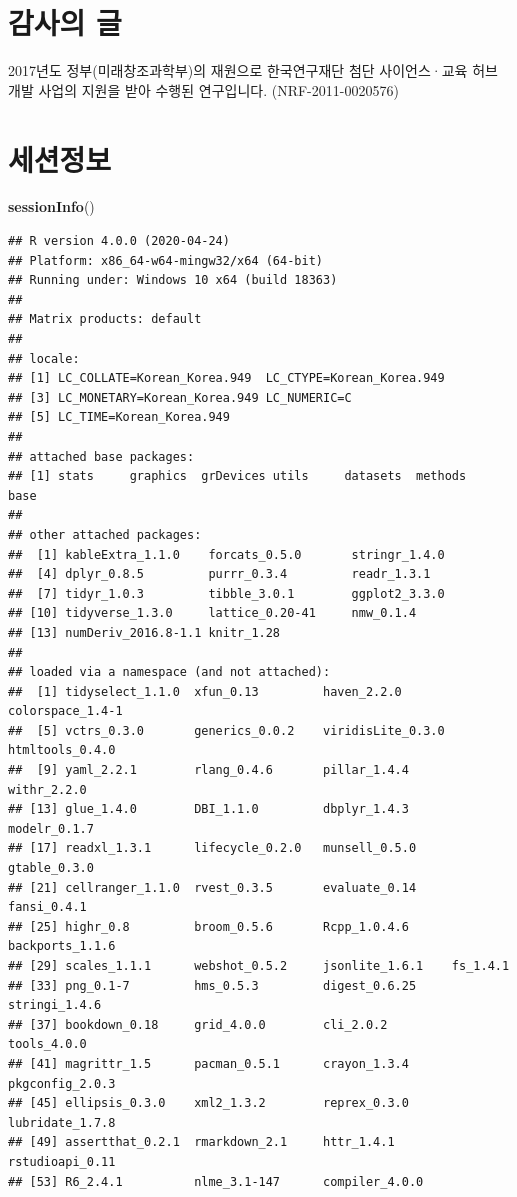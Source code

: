 \documentclass[
  12pt,
]{krantz}
\makeatletter
\newenvironment{Shaded}{\begin{snugshade}}{\end{snugshade}}
\newcommand{\KeywordTok}[1]{\textcolor[rgb]{0.13,0.29,0.53}{\textbf{#1}}}
\newcommand{\NormalTok}[1]{#1}
\newenvironment{kframe}{%
\medskip{}
\setlength{\fboxsep}{.8em}
 \def\at@end@of@kframe{}%
 \ifinner\ifhmode%
  \def\at@end@of@kframe{\end{minipage}}%
  \begin{minipage}{\columnwidth}%
 \fi\fi%
 \def\FrameCommand##1{\hskip\@totalleftmargin \hskip-\fboxsep
 \colorbox{shadecolor}{##1}\hskip-\fboxsep
     \hskip-\linewidth \hskip-\@totalleftmargin \hskip\columnwidth}%
 \MakeFramed {\advance\hsize-\width
   \@totalleftmargin\z@ \linewidth\hsize
   \@setminipage}}%
 {\par\unskip\endMakeFramed%
 \at@end@of@kframe}
\renewenvironment{Shaded}{\begin{kframe}}{\end{kframe}}
\makeatother
\begin{document}
\hypertarget{acknowledgement}{%
\chapter{감사의 글}\label{acknowledgement}}

2017년도 정부(미래창조과학부)의 재원으로 한국연구재단 첨단 사이언스·교육 허브 개발 사업의 지원을 받아 수행된 연구입니다. (NRF-2011-0020576)

\backmatter

\hypertarget{appendix-uxbcc4uxcca8}{%
\appendix {}}


\hypertarget{uxc138uxc158uxc815uxbcf4}{%
\chapter{세션정보}\label{uxc138uxc158uxc815uxbcf4}}

\begin{Shaded}
\begin{Highlighting}[]
\KeywordTok{sessionInfo}\NormalTok{()}
\end{Highlighting}
\end{Shaded}

\begin{verbatim}
## R version 4.0.0 (2020-04-24)
## Platform: x86_64-w64-mingw32/x64 (64-bit)
## Running under: Windows 10 x64 (build 18363)
## 
## Matrix products: default
## 
## locale:
## [1] LC_COLLATE=Korean_Korea.949  LC_CTYPE=Korean_Korea.949   
## [3] LC_MONETARY=Korean_Korea.949 LC_NUMERIC=C                
## [5] LC_TIME=Korean_Korea.949    
## 
## attached base packages:
## [1] stats     graphics  grDevices utils     datasets  methods   base     
## 
## other attached packages:
##  [1] kableExtra_1.1.0    forcats_0.5.0       stringr_1.4.0      
##  [4] dplyr_0.8.5         purrr_0.3.4         readr_1.3.1        
##  [7] tidyr_1.0.3         tibble_3.0.1        ggplot2_3.3.0      
## [10] tidyverse_1.3.0     lattice_0.20-41     nmw_0.1.4          
## [13] numDeriv_2016.8-1.1 knitr_1.28         
## 
## loaded via a namespace (and not attached):
##  [1] tidyselect_1.1.0  xfun_0.13         haven_2.2.0       colorspace_1.4-1 
##  [5] vctrs_0.3.0       generics_0.0.2    viridisLite_0.3.0 htmltools_0.4.0  
##  [9] yaml_2.2.1        rlang_0.4.6       pillar_1.4.4      withr_2.2.0      
## [13] glue_1.4.0        DBI_1.1.0         dbplyr_1.4.3      modelr_0.1.7     
## [17] readxl_1.3.1      lifecycle_0.2.0   munsell_0.5.0     gtable_0.3.0     
## [21] cellranger_1.1.0  rvest_0.3.5       evaluate_0.14     fansi_0.4.1      
## [25] highr_0.8         broom_0.5.6       Rcpp_1.0.4.6      backports_1.1.6  
## [29] scales_1.1.1      webshot_0.5.2     jsonlite_1.6.1    fs_1.4.1         
## [33] png_0.1-7         hms_0.5.3         digest_0.6.25     stringi_1.4.6    
## [37] bookdown_0.18     grid_4.0.0        cli_2.0.2         tools_4.0.0      
## [41] magrittr_1.5      pacman_0.5.1      crayon_1.3.4      pkgconfig_2.0.3  
## [45] ellipsis_0.3.0    xml2_1.3.2        reprex_0.3.0      lubridate_1.7.8  
## [49] assertthat_0.2.1  rmarkdown_2.1     httr_1.4.1        rstudioapi_0.11  
## [53] R6_2.4.1          nlme_3.1-147      compiler_4.0.0
\end{verbatim}
\end{document}
